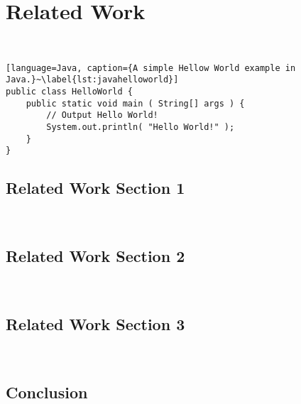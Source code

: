 %
\chapter{Related Work}
~\label{sec:related}




\begin{lstlisting}[language=Java, caption={A simple Hellow World example in Java.}~\label{lst:javahelloworld}]
public class HelloWorld {
	public static void main ( String[] args ) {
		// Output Hello World!
		System.out.println( "Hello World!" );
	}
}
\end{lstlisting}



\section{Related Work Section 1}
~\label{sec:related:sec1}



\section{Related Work Section 2}
~\label{sec:related:sec2}



\section{Related Work Section 3}
~\label{sec:related:sec3}



\section{Conclusion}
~\label{sec:related:conclusion}


